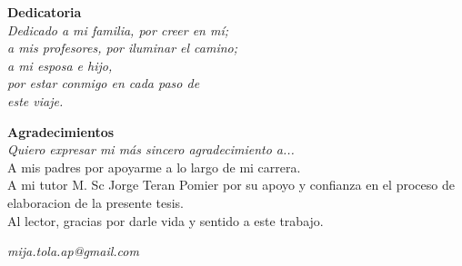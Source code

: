 \documentclass[12pt, openany]{book}
\begin{document}
\begin{flushright}
  \textbf{Dedicatoria} \\
\textit{Dedicado a mi familia, por creer en mí;\\
 a mis profesores, por iluminar el camino;\\ 
a mi esposa e hijo, \\ 
por estar conmigo en cada paso de  \\
este viaje.}
\end{flushright}

\vspace{2cm} 
\newpage
\thispagestyle{plain} %
\vspace*{\fill} 

\begin{flushleft}
\textbf{Agradecimientos}\\ 
\textit{Quiero expresar mi más sincero agradecimiento a...}\\
A mis padres por apoyarme a lo largo de mi carrera. \\
A mi tutor M. Sc Jorge Teran Pomier por su apoyo y confianza en el proceso de elaboracion
de la presente tesis.\\
Al lector, gracias por darle vida y sentido a este trabajo.
\vspace{2cm}
\begin{flushright}
\textit{mija.tola.ap@gmail.com}
\end{flushright}
\end{flushleft}

\vspace{\fill} %

\newpage


\doublespacing
\tableofcontents
\newpage
\listoffigures
\newpage
\listoftables
\newpage








\end{document}
